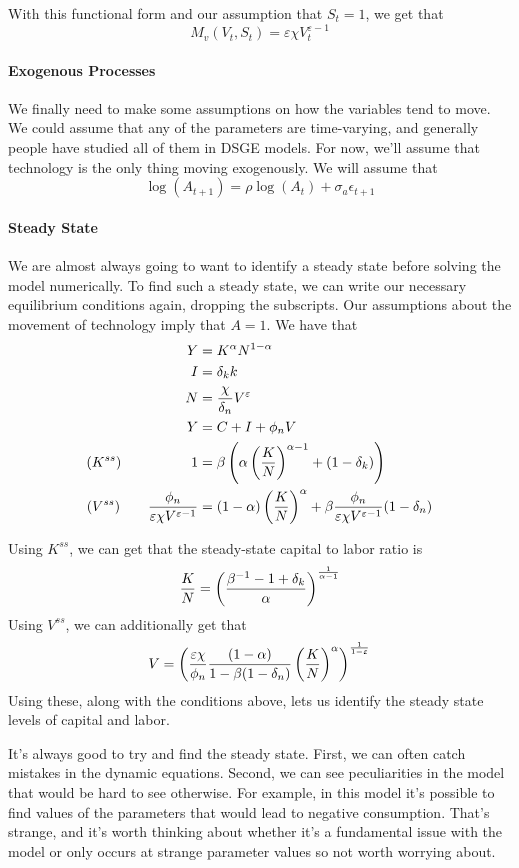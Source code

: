 \documentclass[10pt]{article}
\begin{document}
With this functional form and our assumption that $S_t = 1$, we get that
\[
M_v(V_t,S_t) = \varepsilon \chi V_t^{\varepsilon - 1}
\] 

\paragraph{Exogenous Processes} We finally need to make some assumptions on how the variables tend to move. We could assume that any of the parameters are time-varying, and generally people have studied all of them in DSGE models. For now, we'll assume that technology is the only thing moving exogenously. We will assume that
\[
\log (A_{t+1}) = \rho \log(A_t) + \sigma_a \epsilon_{t+1}
\]

\paragraph{Steady State} We are almost always going to want to identify a steady state before solving the model numerically. To find such a steady state, we can write our necessary equilibrium conditions again, dropping the subscripts. Our assumptions about the movement of technology imply that $A = 1$. We have that
\begin{align*}
	Y &= K^\alpha N^{1-\alpha} \\
	I &= \delta_k k \\
	N &= \frac{\chi}{\delta_n} V^\varepsilon \\
	Y &= C + I + \phi_n V \\
	(K^{ss}) \qquad\qquad\quad 1 &= \beta\left( \alpha \left( \frac{K}{N}\right)^{\alpha - 1} + (1-\delta_k)\right) \\
	(V^{ss}) \qquad \frac{\phi_n}{\varepsilon \chi V^{\varepsilon - 1}} &= (1-\alpha) \left( \frac{K}{N}\right)^\alpha + \beta  \frac{\phi_n}{\varepsilon \chi V^{\varepsilon - 1}} (1-\delta_n)
\end{align*}

Using $K^{ss}$, we can get that the steady-state capital to labor ratio is
\[
\frac{K}{N} = \left( \frac{\beta^{-1} - 1 + \delta_k}{\alpha}\right)^\frac{1}{\alpha - 1}
\]
Using $V^{ss}$, we can additionally get that
\[
V = \left( \frac{\varepsilon\chi}{\phi_n} \frac{(1-\alpha)}{1-\beta(1-\delta_n)} \left( \frac{K}{N}\right)^\alpha  \right)^\frac{1}{1-\varepsilon}
\]
Using these, along with the conditions above, lets us identify the steady state levels of capital and labor. 

\begin{remark}
	It's always good to try and find the steady state. First, we can often catch mistakes in the dynamic equations. Second, we can see peculiarities in the model that would be hard to see otherwise. For example, in this model it's possible to find values of the parameters that would lead to negative consumption. That's strange, and it's worth thinking about whether it's a fundamental issue with the model or only occurs at strange parameter values so not worth worrying about.
\end{remark}
\end{document}
